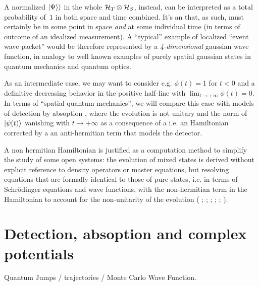 A normalized $|\Psi\rangle\rangle$ in the whole $\mathcal{H}_T \otimes \mathcal{H}_S$,
instead,
can be interpreted as a total probability of~$1$ in both space and time combined.
It's an  that, as such, must certainly be in some point in space
\emph{and} at some individual time (in terms of outcome of an idealized measurement).
A ``typical'' example of localized ``event wave packet'' would be
therefore represented by
a \emph{4-dimensional} gaussian wave function,
in analogy to well known examples of purely spatial gaussian states
in quantum mechanics and quantum optics.

As an intermediate case, we may want to consider e.g.
$\phi(t) = 1$ for $t < 0 $ and a definitive decreasing behavior
in the positive half-line with $\lim_{t \to +\infty} \phi(t) = 0$.
In terms of ``spatial quantum mechanics'', we will compare this case with
models of detection by absoption \parencite{RuschhauptAbsorption},
where the evolution is not unitary and
the norm of $\ket{\psi(t)}$ vanishing with $t \to +\infty$
as a consequence of a 
i.e.
an Hamiltonian corrected by a an anti-hermitian term
that models the detector.

A non hermitian Hamiltonian is justified as a computation method
to simplify the study of some open systems: the evolution of mixed
states is derived without explicit reference to density operators
or master equations, but resolving equations that are formally
identical to those of pure states,
i.e. in terms of
Schr{\"o}dinger equations and wave functions,
with the non-hermitian term in the Hamiltonian
to account for the non-unitarity of the evolution
(%
  \cite[Ch. 6]{TQM2};
  \cite{Wave-function_approach};
  \cite{HowToResetAnAtom};
  \cite{TheQuantumJumpApproach};
  \cite[\S 8.5 ``The `quantum jump' approach to damping'' and particularly \S 8.5.2 ``The wave function Monte Carlo approach to damping'']{ScullyZubairy};
  \cite[\S 6.7 ``Stochastic Unravellings'']{WallsMilburn}%
).

\section{Detection, absoption and complex potentials}

Quantum Jumps / trajectories / Monte Carlo Wave Function.

